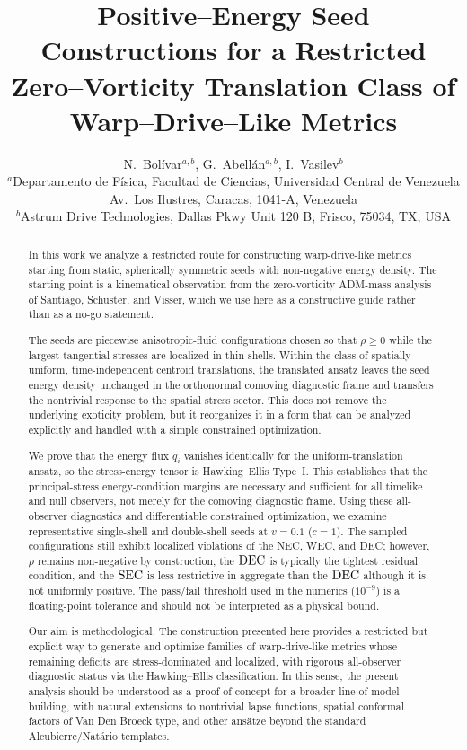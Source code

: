 \documentclass[11pt]{article}
\title{Positive--Energy Seed Constructions for a Restricted Zero--Vorticity Translation Class of Warp--Drive--Like Metrics}
\author{N.~Bol\'ivar$^{a,b}$, G.~Abell\'an$^{a,b}$, I.~Vasilev$^b$ \\
$^a$Departamento de F\'isica, Facultad de Ciencias, Universidad Central de Venezuela \\
Av.~Los Ilustres, Caracas, 1041-A, Venezuela \\
$^b$Astrum Drive Technologies, Dallas Pkwy Unit 120 B, Frisco, 75034, TX, USA}
\date{}
\makeatletter
\newcommand{\@abbr}[1]{\ifmmode\mathrm{#1}\else\textsc{#1}\fi}
\newcommand{\WEC}{\@abbr{WEC}}
\newcommand{\NEC}{\@abbr{NEC}}
\newcommand{\SEC}{\@abbr{SEC}}
\newcommand{\DEC}{\@abbr{DEC}}
\makeatother
\begin{document}
\maketitle

\begin{abstract}

In this work we analyze a restricted route for constructing warp-drive-like metrics starting from static, spherically symmetric seeds with non-negative energy density. The starting point is a kinematical observation from the zero-vorticity ADM-mass analysis of Santiago, Schuster, and Visser, which we use here as a constructive guide rather than as a no-go statement.

The seeds are piecewise anisotropic-fluid configurations chosen so that $\rho\ge 0$ while the largest tangential stresses are localized in thin shells. Within the class of spatially uniform, time-independent centroid translations, the translated ansatz leaves the seed energy density unchanged in the orthonormal comoving diagnostic frame and transfers the nontrivial response to the spatial stress sector. This does not remove the underlying exoticity problem, but it reorganizes it in a form that can be analyzed explicitly and handled with a simple constrained optimization.

We prove that the energy flux $q_i$ vanishes identically for the uniform-translation ansatz, so the stress-energy tensor is Hawking--Ellis Type~I. This establishes that the principal-stress energy-condition margins are necessary and sufficient for all timelike and null observers, not merely for the comoving diagnostic frame. Using these all-observer diagnostics and differentiable constrained optimization, we examine representative single-shell and double-shell seeds at $v=0.1$ ($c=1$). The sampled configurations still exhibit localized violations of the \NEC, \WEC, and \DEC; however, $\rho$ remains non-negative by construction, the $\DEC$ is typically the tightest residual condition, and the $\SEC$ is less restrictive in aggregate than the $\DEC$ although it is not uniformly positive. The pass/fail threshold used in the numerics ($10^{-9}$) is a floating-point tolerance and should not be interpreted as a physical bound.

Our aim is methodological. The construction presented here provides a restricted but explicit way to generate and optimize families of warp-drive-like metrics whose remaining deficits are stress-dominated and localized, with rigorous all-observer diagnostic status via the Hawking--Ellis classification. In this sense, the present analysis should be understood as a proof of concept for a broader line of model building, with natural extensions to nontrivial lapse functions, spatial conformal factors of Van Den Broeck type, and other ans\"atze beyond the standard Alcubierre/Nat\'ario templates.
\end{abstract}
\end{document}
